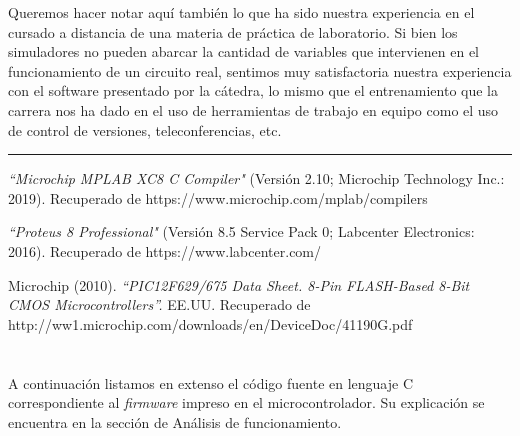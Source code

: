 \documentclass[a4paper]{article}
\let\originalappendix\appendix
\renewcommand{\appendix}{%
    \newpage\originalappendix\pagenumbering{gobble}%
    \renewcommand\thesection{Anexo \Alph{section}}
    \setcounter{secnumdepth}{1}
}
\begin{document}
Queremos hacer notar aquí también lo que ha sido nuestra 
experiencia en el cursado a distancia de una materia de
práctica de laboratorio. Si bien los simuladores no pueden
abarcar la cantidad de variables que intervienen en el 
funcionamiento de un circuito real, sentimos muy 
satisfactoria nuestra experiencia con el software 
presentado por la cátedra, lo mismo que el entrenamiento 
que la carrera nos ha dado en el uso de herramientas de 
trabajo en equipo como el uso de control de versiones, 
teleconferencias, etc.

\noindent\rule{\textwidth}{1pt}

\begin{thebibliography}{9}

\textit{``Microchip MPLAB XC8 C Compiler"}
(Versión 2.10; Microchip Technology Inc.: 2019).
Recuperado de https://www.microchip.com/mplab/compilers

\textit{``Proteus 8 Professional"} 
(Versión 8.5 Service Pack 0; Labcenter Electronics: 2016).
Recuperado de https://www.labcenter.com/

Microchip (2010).
\textit{``PIC12F629/675 Data Sheet. 8-Pin FLASH-Based 8-Bit CMOS 
Microcontrollers''.}
EE.UU. Recuperado de 
http://ww1.microchip.com/downloads/en/DeviceDoc/41190G.pdf

\end{thebibliography}


\appendix

\section{}
A continuación listamos en extenso el código fuente en lenguaje 
C correspondiente al \textit{firmware} impreso en el 
microcontrolador. Su explicación se encuentra en la sección de 
Análisis de funcionamiento.


\end{document}
